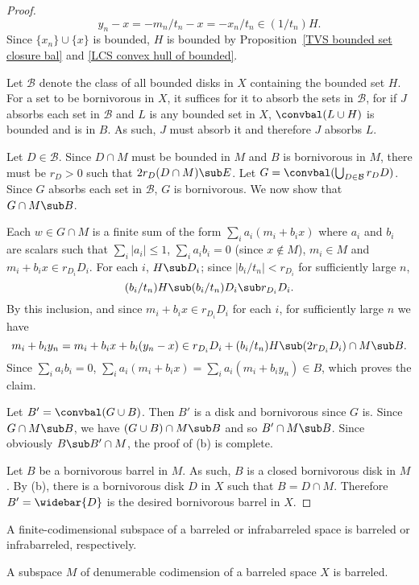 \begin{proof}
\[y_n-x=-m_n/t_n-x=-x_n/t_n\in(1/t_n)H.\]
Since $\{x_n\}\cup\{x\}$ is bounded, $H$ is bounded by Proposition~\ref{TVS bounded set closure bal} and \ref{LCS convex hull of bounded}.\par
Let $\mathcal{B}$ denote the class of all bounded disks in $X$ containing the bounded set $H$. For a set to be bornivorous in $X$, it suffices for it to absorb the sets in $\mathcal{B}$, for if $J$ absorbs each set in $\mathcal{B}$ and $L$ is any bounded set in $X$, $\convbal(L\cup H)$ is bounded and is in $B$. As such, $J$ must absorb it and therefore $J$ absorbs $L$.\par
Let $D\in\mathcal{B}$. Since $D\cap M$ must be bounded in $M$ and $B$ is bornivorous in $M$, there must be $r_D>0$ such that $2r_D(D\cap M)\sub E$. Let $G=\convbal(\bigcup_{D\in\mathcal{B}}r_DD)$. Since $G$ absorbs each set in $\mathcal{B}$, $G$ is bornivorous. We now show that $G\cap M\sub B$.\par
Each $w\in G\cap M$ is a finite sum of the form $\sum_ia_i(m_i+b_ix)$ where $a_i$ and $b_i$ are scalars such that $\sum_i|a_i|\leq 1$, $\sum_ia_ib_i=0$ (since $x\notin M$), $m_i\in M$ and $m_i+b_ix\in r_{D_i}D_i$. For each $i$, $H\sub D_i$; since $|b_i/t_n|<r_{D_i}$ for sufficiently large $n$,
\[(b_i/t_n)H\sub (b_i/t_n)D_i\sub r_{D_i}D_i.\]
By this inclusion, and since $m_i+b_ix\in r_{D_i}D_i$ for each $i$, for sufficiently large $n$ we have
\[m_i+b_iy_n=m_i+b_ix+b_i(y_n-x)\in r_{D_i}D_i+(b_i/t_n)H\sub (2r_{D_i}D_i)\cap M\sub B.\]
Since $\sum_ia_ib_i=0$, $\sum_ia_i(m_i+b_ix)=\sum_ia_i(m_i+b_iy_n)\in B$, which proves the claim.\par
Let $B'=\convbal(G\cup B)$. Then $B'$ is a disk and bornivorous since $G$ is. Since $G\cap M\sub B$, we have $(G\cup B)\cap M\sub B$ and so $B'\cap M\sub B$. Since obviously $B\sub B'\cap M$, the proof of (b) is complete.\par
Let $B$ be a bornivorous barrel in $M$. As such, $B$ is a closed bornivorous disk in $M$. By (b), there is a bornivorous disk $D$ in $X$ such that $B=D\cap M$. Therefore $B'=\widebar{D}$ is the desired bornivorous barrel in $X$.
\end{proof}
\begin{proposition}
A finite-codimensional subspace of a barreled or infrabarreled space is barreled or infrabarreled, respectively.
\end{proposition}
\begin{proposition}\label{LCS barreled denumerable-codim is barreled}
A subspace $M$ of denumerable codimension of a barreled space $X$ is barreled.
\end{proposition}
